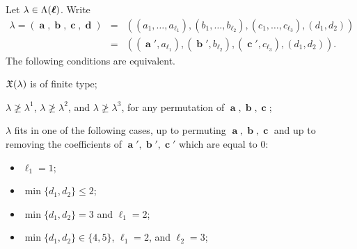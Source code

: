 \documentclass[12pt,reqno]{amsart}
\begin{document}
\begin{theorem}\label{Thm:classification.finite.type.MFV}
Let $\lambda\in\Lambda(\boldsymbol{\ell})$.
Write
\begin{eqnarray*}
\lambda=(\mbfa,\mbfb,\mbfc,\mbfd) & = & ((a_1,\ldots,a_{\ell_1}),(b_1,\ldots,b_{\ell_2}),(c_1,\ldots,c_{\ell_3}),(d_1,d_2)) \\
 & = & ((\mbfa',a_{\ell_1}),(\mbfb',b_{\ell_2}),(\mbfc',c_{\ell_3}),(d_1,d_2)).
\end{eqnarray*}
The following conditions are equivalent.
\begin{penumerate}
\item $\mathfrak{X}(\lambda)$ is of finite type;
\item $\lambda\not\geq\lambda^1$, $\lambda\not\geq\lambda^2$, and $\lambda\not\geq\lambda^3$,
for any permutation of $\mbfa,\mbfb,\mbfc$;
\item $\lambda$ fits in one of the following cases, up to permuting $\mbfa,\mbfb,\mbfc$ and up to removing the coefficients of $\mbfa',\mbfb',\mbfc'$ which are equal to $0$:
\begin{itemize}
\item[\rm (o)] $\ell_1=1$;
\item[\rm (a)] $\min\{d_1,d_2\}\leq 2$;
\item[\rm (b)] $\min\{d_1,d_2\}=3$ and $\ell_1=2$;

\item[\rm (c)] $\min\{d_1,d_2\}\in\{4,5\}$, $\ell_1=2$, and $\ell_2=3$;


\end{itemize}
\end{penumerate}
\end{theorem}
\end{document}
